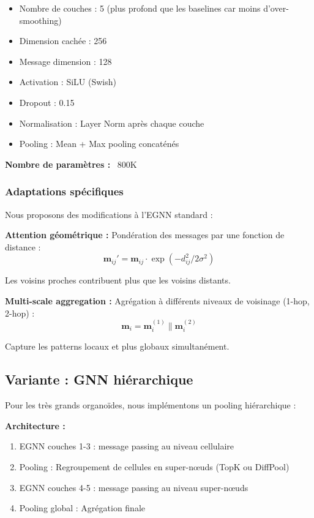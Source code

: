 \begin{itemize}
    \item Nombre de couches : 5 (plus profond que les baselines car moins d'over-smoothing)
    \item Dimension cachée : 256
    \item Message dimension : 128
    \item Activation : SiLU (Swish)
    \item Dropout : 0.15
    \item Normalisation : Layer Norm après chaque couche
    \item Pooling : Mean + Max pooling concaténés
\end{itemize}

\textbf{Nombre de paramètres :} ~800K

\subsubsection{Adaptations spécifiques}

Nous proposons des modifications à l'EGNN standard :

\textbf{Attention géométrique :}
Pondération des messages par une fonction de distance :
\[
\mathbf{m}_{ij}' = \mathbf{m}_{ij} \cdot \exp(-d_{ij}^2 / 2\sigma^2)
\]

Les voisins proches contribuent plus que les voisins distants.

\textbf{Multi-scale aggregation :}
Agrégation à différents niveaux de voisinage (1-hop, 2-hop) :
\[
\mathbf{m}_i = \mathbf{m}_i^{(1)} \| \mathbf{m}_i^{(2)}
\]

Capture les patterns locaux et plus globaux simultanément.

\subsection{Variante : GNN hiérarchique}

Pour les très grands organoïdes, nous implémentons un pooling hiérarchique :

\textbf{Architecture :}
\begin{enumerate}
    \item EGNN couches 1-3 : message passing au niveau cellulaire
    \item Pooling : Regroupement de cellules en super-nœuds (TopK ou DiffPool)
    \item EGNN couches 4-5 : message passing au niveau super-nœuds
    \item Pooling global : Agrégation finale
\end{enumerate}


